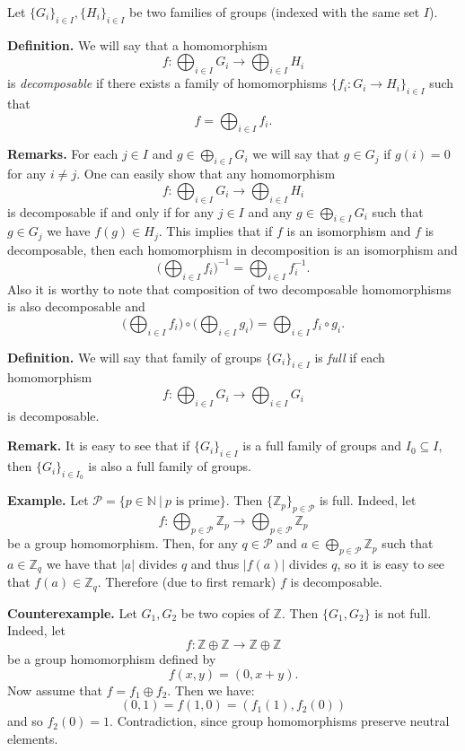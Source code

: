 \documentclass[12pt]{article}
\begin{document}
Let $\{G_i\}_{i\in I}, \{H_i\}_{i\in I}$ be two families of groups (indexed with the same set $I$).

\textbf{Definition.} We will say that a homomorphism $$f:\bigoplus_{i\in I} G_i\to \bigoplus_{i\in I} H_i$$
is \textit{decomposable} if there exists a family of homomorphisms $\{f_i:G_i\to H_i\}_{i\in I}$ such that $$f=\bigoplus_{i\in I} f_i.$$

\textbf{Remarks.} For each $j\in I$ and $g\in \bigoplus_{i\in I} G_i$ we will say that $g\in G_j$ if $g(i)=0$ for any $i\neq j$. One can easily show that any homomorphism $$f:\bigoplus_{i\in I} G_i\to \bigoplus_{i\in I} H_i$$ is decomposable if and only if for any $j\in I$ and any $g\in \bigoplus_{i\in I} G_i$ such that $g\in G_j$ we have $f(g)\in H_j$. This implies that if $f$ is an isomorphism and $f$ is decomposable, then each homomorphism in decomposition is an isomorphism and $$\bigg( \bigoplus_{i\in I}f_i\bigg) ^{-1}=\bigoplus_{i\in I}f_i^{-1}.$$ Also it is worthy to note that composition of two decomposable homomorphisms is also decomposable and
$$\bigg( \bigoplus_{i\in I}f_i\bigg)\circ\bigg( \bigoplus_{i\in I}g_i\bigg)=\bigoplus_{i\in I}f_i\circ g_i.$$

\textbf{Definition.} We will say that family of groups $\{G_i\}_{i\in I}$ is \textit{full} if each homomorphism $$f:\bigoplus_{i\in I} G_i \to \bigoplus_{i\in I} G_i$$ is decomposable.

\textbf{Remark.} It is easy to see that if $\{G_i\}_{i\in I}$ is a full family of groups and $I_0\subseteq I$, then $\{G_i\}_{i\in I_0}$ is also a full family of groups.

\textbf{Example.} Let $\mathcal{P}=\{p\in\mathbb{N}\ |\ p\mbox{ is prime}\}$. Then $\{\mathbb{Z}_p \}_{p\in\mathcal{P}}$ is full. Indeed, let $$f:\bigoplus_{p\in\mathcal{P}} \mathbb{Z}_{p}\to \bigoplus_{p\in\mathcal{P}} \mathbb{Z}_{p}$$ be a group homomorphism. Then, for any $q\in\mathcal{P}$ and $a\in\bigoplus_{p\in\mathcal{P}} \mathbb{Z}_{p}$ such that $a\in\mathbb{Z}_{q}$ we have that $|a|$ divides $q$ and thus $|f(a)|$ divides $q$, so it is easy to see that $f(a)\in\mathbb{Z}_{q}$. Therefore (due to first remark) $f$ is decomposable.

\textbf{Counterexample.} Let $G_1, G_2$ be two copies of $\mathbb{Z}$. Then $\{G_1,G_2\}$ is not full. Indeed, let $$f:\mathbb{Z}\oplus\mathbb{Z}\to\mathbb{Z}\oplus\mathbb{Z}$$ be a group homomorphism defined by $$f(x,y)=(0,x+y).$$ Now assume that $f=f_1\oplus f_2$. Then we have:
$$(0,1)=f(1,0)=(f_1(1),f_2(0))$$
and so $f_2(0)=1$. Contradiction, since group homomorphisms preserve neutral elements.
\end{document}
